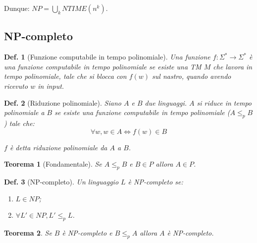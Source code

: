 \documentclass[11pt]{article}
\newtheorem{definition}{Def.}[section]
\newtheorem{theorem}{Teorema}[section]
\begin{document}
Dunque: $NP = \bigcup_k NTIME(n^k)$.

\subsection{NP-completo}

\begin{definition}[Funzione computabile in tempo polinomiale]
	Una funzione $f: \Sigma^* \rightarrow \Sigma^*$ è una funzione computabile 
	in tempo polinomiale se esiste una TM
	$M$ che lavora in tempo polinomiale, tale che si blocca con $f(w)$ sul
	nastro, quando avendo ricevuto $w$ in input.
\end{definition}

\begin{definition}[Riduzione polinomiale]
	Siano $A$ e $B$ due linguaggi. $A$ si riduce in tempo polinomiale a $B$ se 
	esiste una funzione computabile in tempo polinomiale ($ A \leq_p B$) tale 
	che:
	\begin{equation}
		\forall w, w \in A \iff f(w) \in B
	\end{equation}

	$f$ è detta riduzione polinomiale da $A$ a $B$.
\end{definition}

\begin{theorem}[Fondamentale]
	Se $A \leq_p B$ e $B \in P$ allora $A \in P$.
\end{theorem}

\begin{definition}[NP-completo]
	Un linguaggio $L$ è NP-completo se:
	\begin{enumerate}
		\item $L \in NP$;
		\item $\forall L' \in NP, L' \leq_p L$.
	\end{enumerate}
\end{definition}

\begin{theorem}
	Se $B$ è NP-completo e $B \leq_p A$ allora $A$ è NP-completo.
\end{theorem}
\end{document}
